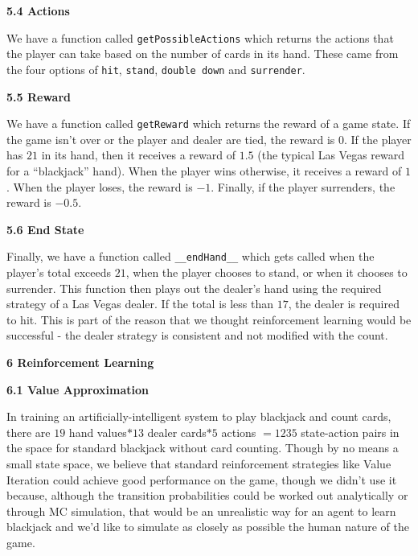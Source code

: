 \documentclass[12pt]{article}
\begin{document}
    \textbf{5.4 Actions} \newline 
    
    We have a function called \texttt{getPossibleActions} which returns the actions that the player can take based on the number of cards in its hand. These came from the four options of \texttt{hit}, \texttt{stand}, \texttt{double down} and \texttt{surrender}. \newline 
    
    \textbf{5.5 Reward} \newline 
    
    We have a function called \texttt{getReward} which returns the reward of a game state. If the game isn't over or the player and dealer are tied, the reward is $0$. If the player has $21$ in its hand, then it receives a reward of $1.5$ (the typical Las Vegas reward for a ``blackjack'' hand). When the player wins otherwise, it receives a reward of $1$. When the player loses, the reward is $-1$. Finally, if the player surrenders, the reward is $-0.5$. \newline 
    
    \textbf{5.6 End State} \newline
    
    Finally, we have a function called \texttt{\_\_endHand\_\_} which gets called when the player's total exceeds $21$, when the player chooses to stand, or when it chooses to surrender. This function then plays out the dealer's hand using the required strategy of a Las Vegas dealer. If the total is less than $17$, the dealer is required to hit. This is part of the reason that we thought reinforcement learning would be successful - the dealer strategy is consistent and not modified with the count. \newline 
    
    {\large \textbf{6 Reinforcement Learning}} \newline
    
    \textbf{6.1 Value Approximation} \newline 
    
    In training an artificially-intelligent system to play blackjack and count cards, there are $19$ hand values$* 13$ dealer cards$* 5$ actions $= 1235$ state-action pairs in the space for standard blackjack without card counting. Though by no means a small state space, we believe that standard reinforcement strategies like Value Iteration could achieve good performance on the game, though we didn't use it because, although the transition probabilities could be worked out analytically or through MC simulation, that would be an unrealistic way for an agent to learn blackjack and we'd like to simulate as closely as possible the human nature of the game. \newline 
\end{document}
